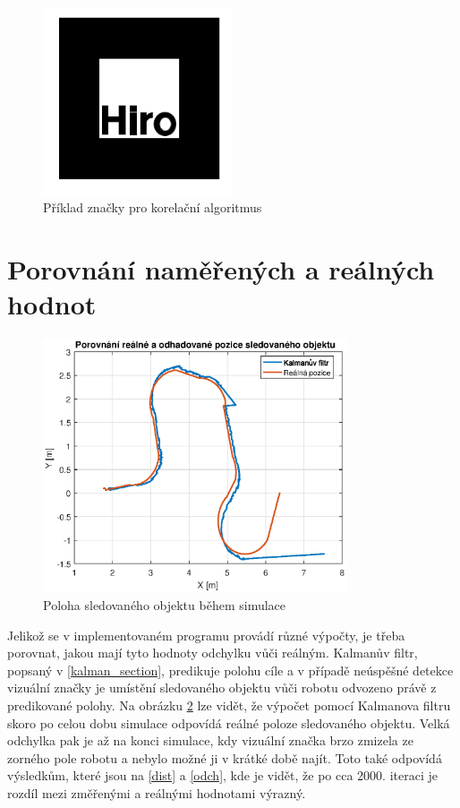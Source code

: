 \documentclass[twoside]{ctuthesis}
\theoremstyle{plain}
\theoremstyle{definition}
\theoremstyle{note}
\begin{document}
\begin{figure}[H]
	\caption{Příklad značky pro korelační algoritmus}

	\label{hiro}
	\includegraphics[width=0.5\textwidth]{images/5/r1301.jpg}
\end{figure}

\section{Porovnání naměřených a reálných hodnot}

\begin{figure}[hbt]
	\caption{Poloha sledovaného objektu během simulace}

	\label{sled}
	\includegraphics[width=0.8\textwidth]{images/5/pos_pioner.eps}
\end{figure}

Jelikož se v implementovaném programu provádí různé výpočty, je třeba porovnat, jakou mají tyto hodnoty odchylku vůči reálným. Kalmanův filtr, popsaný v \ref{kalman_section}, predikuje polohu cíle a v případě neúspěšné detekce vizuální značky je umístění sledovaného objektu vůči robotu odvozeno právě z predikované polohy. Na obrázku \ref{sled} lze vidět, že výpočet pomocí Kalmanova filtru skoro po celou dobu simulace odpovídá reálné poloze sledovaného objektu. Velká odchylka pak je až na konci simulace, kdy vizuální značka brzo zmizela ze zorného pole robotu a nebylo možné ji v krátké době najít. Toto také odpovídá výsledkům, které jsou na \ref{dist} a \ref{odch}, kde je vidět, že po cca 2000. iteraci je rozdíl mezi změřenými a reálnými hodnotami výrazný.
\end{document}
